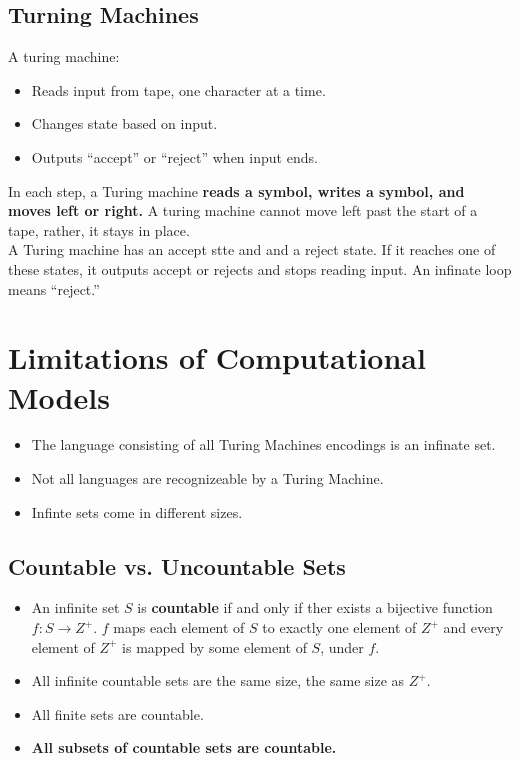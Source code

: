\documentclass[letter]{article}
\begin{document}
\begin{multicols}{2}
	\subsection{Turning Machines}
	A turing machine:
	\begin{itemize}
		\item Reads input from tape, one character at a time.
		\item Changes state based on input.
		\item Outputs ``accept'' or ``reject'' when input ends.
	\end{itemize}
	In each step, a Turing machine \textbf{reads a symbol, writes a symbol, and
	moves left or right.} A turing machine cannot move left past the start of a
	tape, rather, it stays in place. \\
	A Turing machine has an accept stte and and a reject state. If it reaches one
	of these states, it outputs accept or rejects and stops reading input. An
	infinate loop means ``reject.'' \\

	\section{Limitations of Computational Models}
	\begin{itemize}
		\item The language consisting of all Turing Machines encodings is an
					infinate set.
		\item Not all languages are recognizeable by a Turing Machine.
		\item Infinte sets come in different sizes.
	\end{itemize}
	\subsection{Countable vs. Uncountable Sets}
	\begin{itemize}
		\item An infinite set $S$ is \textbf{countable} if and only if ther exists a
					bijective function $f: S \rightarrow Z^+$. $f$ maps each element of
					$S$ to exactly one element of $Z^+$ and every element of $Z^+$ is
					mapped by some element of $S$, under $f$.
		\item All infinite countable sets are the same size, the same size as $Z^+$.
		\item All finite sets are countable.
		\item \textbf{All subsets of countable sets are countable.}
	\end{itemize}

\end{multicols}
\end{document}
